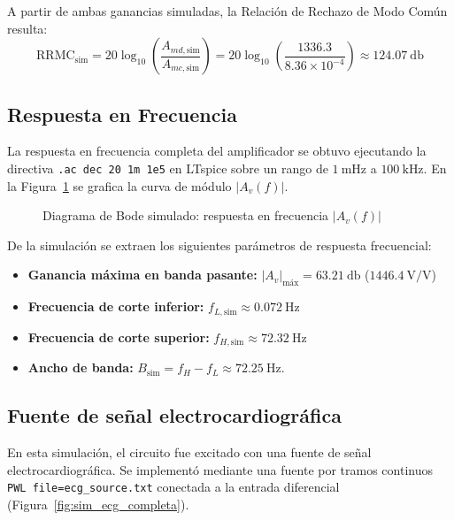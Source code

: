 A partir de ambas ganancias simuladas, la Relación de Rechazo de Modo Común
resulta:
\begin{equation*}
  \text{RRMC}_{\text{sim}} = 20 \log_{10} \left( \frac{A_{md,\text{sim}}}{A_{mc,\text{sim}}} \right) = 20 \log_{10} \left( \frac{1336.3}{8.36 \times 10^{-4}} \right) \approx \SI{124.07}{\decibel}
\end{equation*}

\FloatBarrier
\subsection{Respuesta en Frecuencia}
La respuesta en frecuencia completa del amplificador se obtuvo ejecutando la directiva \texttt{.ac dec 20 1m 1e5} en LTspice sobre un rango de $\SI{1}{\milli\hertz}$ a $\SI{100}{\kilo\hertz}$. En la Figura~\ref{fig:sim_bode_solo} se grafica la curva de módulo $|A_v(f)|$.

\begin{figure}[!ht]
  \centering
  \resizebox{0.90\textwidth}{!}{%
  }
    \caption{Diagrama de Bode simulado: respuesta en frecuencia $|A_v(f)|$}
  \label{fig:sim_bode_solo}
\end{figure}

De la simulación se extraen los siguientes parámetros de respuesta frecuencial:
\begin{itemize}
  \item \textbf{Ganancia máxima en banda pasante:} $|A_v|_{\text{máx}} = \SI{63.21}{\decibel}$ ($1446.4\ \text{V/V}$)
  \item \textbf{Frecuencia de corte inferior:} $f_{L,\text{sim}} \approx \SI{0.072}{\hertz}$
  \item \textbf{Frecuencia de corte superior:} $f_{H,\text{sim}} \approx \SI{72.32}{\hertz}$
  \item \textbf{Ancho de banda:} $B_{\text{sim}} = f_H - f_L \approx \SI{72.25}{\hertz}$.
\end{itemize}

\FloatBarrier
\subsection{Fuente de señal electrocardiográfica} En esta simulación, el circuito fue excitado con una fuente de señal electrocardiográfica. Se implementó mediante una fuente por tramos continuos \texttt{PWL file=ecg\_source.txt} conectada a la entrada diferencial (Figura~\ref{fig:sim_ecg_completa}).

